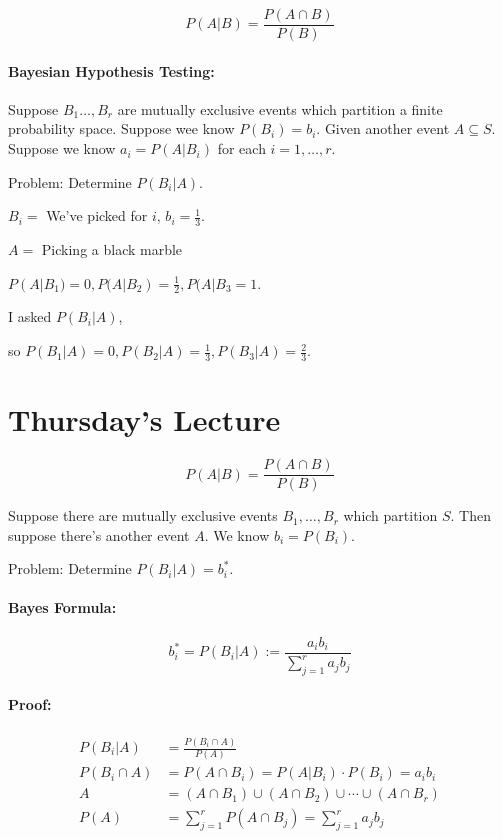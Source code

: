 \documentclass[a4paper, 11pt, twoside]{article}
\begin{document}
\[P(A|B)=\frac{P(A\cap B)}{P(B)}\]

\paragraph{Bayesian Hypothesis Testing:} Suppose $B_1\dots, B_r$ are mutually exclusive events which partition a finite probability space. Suppose wee know $P(B_i)=b_i$. Given another event $A\subseteq S$. Suppose we know $a_i=P(A|B_i)$ for each $i=1,\dots, r$.

Problem: Determine $P(B_i|A)$.

$B_i=$ We've picked for $i$, $b_i=\frac{1}{3}$.

$A=$ Picking a black marble

$P(A|B_1)=0, P(A|B_2)=\frac{1}{2}, P(A|B_3=1$.

I asked $P(B_i|A)$,

so $P(B_1|A)=0, P(B_2|A)=\frac{1}{3}, P(B_3|A)=\frac{2}{3}$.

\section{Thursday's Lecture}

\[P(A|B)=\frac{P(A\cap B)}{P(B)}\]

Suppose there are mutually exclusive events $B_1,\dots, B_r$ which partition $S$. Then suppose there's another event $A$. We know $b_i=P(B_i)$.

Problem: Determine $P(B_i|A)=b_i^*$.

\paragraph{Bayes Formula:}

\[b_i^*=P(B_i|A):=\frac{a_ib_i}{\sum^r_{j=1}a_jb_j}\]

\paragraph{Proof:}

\[
\begin{split}
	P(B_i|A)&=\frac{P(B_i\cap A)}{P(A)}\\
	P(B_i\cap A) &= P(A \cap B_i) = P(A|B_i)\cdot P(B_i) = a_ib_i\\
	A&=(A\cap B_1)\cup (A\cap B_2)\cup \cdots \cup (A\cap B_r)\\
	P(A)&=\sum^r_{j=1}P(A\cap B_j) = \sum^r_{j=1}a_jb_j
\end{split}
\]
\end{document}
